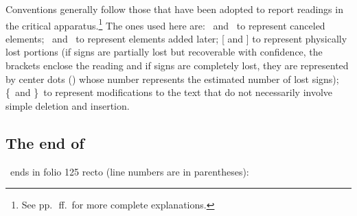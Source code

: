 Conventions generally follow those that have been adopted to report readings in the critical apparatus.\footnote{See pp.~\pageref{sec:symbols}\,ff.\ for more complete explanations.} The ones used here are: 
  \ccs\ and \cce\ to represent canceled elements; 
  \ins\ and \ine\ to represent elements added later;
  [ and ] to represent physically lost portions (if signs are partially lost but recoverable with confidence, the brackets enclose the reading and if signs are completely lost, they are represented by center dots () whose number represents the estimated number of lost signs);
  \{\ and \}\ to represent modifications to the text that do not necessarily involve simple deletion and insertion.
  
\newcommand{\HTG}{\textdb{❋}}
\subsection{The end of \Tm}
\Tm\ ends in folio 125 recto (line numbers are in parentheses):
